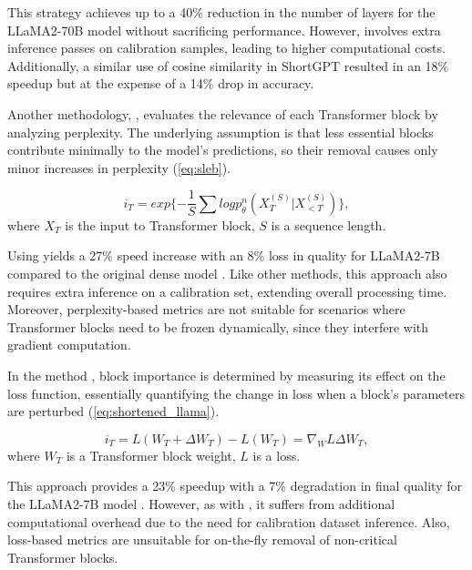         This strategy achieves up to a 40\% reduction in the number of layers for the LLaMA2-70B model \cite{uidl} without sacrificing performance. However, \uidl{} involves extra inference passes on calibration samples, leading to higher computational costs. Additionally, a similar use of cosine similarity in ShortGPT \cite{men2024shortgptlayerslargelanguage} resulted in an 18\% speedup but at the expense of a 14\% drop in accuracy.

        Another methodology, \sleb{} \cite{sleb}, evaluates the relevance of each Transformer block by analyzing perplexity. The underlying assumption is that less essential blocks contribute minimally to the model’s predictions, so their removal causes only minor increases in perplexity (\ref{eq:sleb}).
    
        \begin{equation}\label{eq:sleb}
            i_T = exp\{-\frac{1}{S}\sum log p_\theta^n (X_T^{(S)}|X_{<T}^{(S)})\},
        \end{equation}
        where $X_T$ is the input to Transformer block, $S$ is a sequence length.

        Using \sleb{} yields a 27\% speed increase with an 8\% loss in quality for LLaMA2-7B compared to the original dense model \cite{sleb}. Like other methods, this approach also requires extra inference on a calibration set, extending overall processing time. Moreover, perplexity-based metrics are not suitable for scenarios where Transformer blocks need to be frozen dynamically, since they interfere with gradient computation.

        In the \shortllama{} method \cite{kim2024shortenedllamadepthpruning}, block importance is determined by measuring its effect on the loss function, essentially quantifying the change in loss when a block’s parameters are perturbed (\ref{eq:shortened_llama}).

        \begin{equation}\label{eq:shortened_llama}
            i_T = \mathit{L}(W_T + \Delta W_T) - \mathit{L}(W_T) = \nabla_W \mathit{L} \Delta W_T,
        \end{equation}
        where $W_T$ is a Transformer block weight, $L$ is a loss.

        This approach provides a 23\% speedup with a 7\% degradation in final quality for the LLaMA2-7B model \cite{kim2024shortenedllamadepthpruning}. However, as with \sleb{}, it suffers from additional computational overhead due to the need for calibration dataset inference. Also, loss-based metrics are unsuitable for on-the-fly removal of non-critical Transformer blocks.

